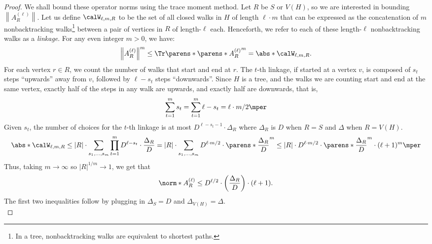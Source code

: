 \documentclass[11pt,letterpaper]{article}
\begin{document}
    \begin{proof}
        We shall bound these operator norms using the trace moment method. Let $R$ be $S$ or $V(H)$, so we are interested in bounding $\left\|A^{(\ell)}_R\right\|$. Let us define $\calW_{\ell,m,R}$ to be the set of all closed walks in $H$ of length $\ell\cdot m$ that can be expressed as the concatenation of $m$ nonbacktracking walks\footnote{In a tree, nonbacktracking walks are equivalent to shortest paths.} between a pair of vertices in $R$ of length-$\ell$ each.
        Henceforth, we refer to each of these length-$\ell$ nonbacktracking walks as a \emph{linkage}.
        For any even integer $m > 0$, we have:
        \[ \left\| A^{(\ell)}_R \right\|^m \le \Tr\parens*{ \parens*{A^{(\ell)}_R}^m } = \abs*{\calW_{\ell,m,R}}. \]
        For each vertex $r\in R$, we count the number of walks that start and end at $r$.
        The $t$-th linkage, if started at a vertex $v$, is composed of $s_t$ steps ``upwards'' away from $v$, followed by $\ell-s_t$ steps ``downwards''.
        Since $H$ is a tree, and the walks we are counting start and end at the same vertex, exactly half of the steps in any walk are upwards, and exactly half are downwards, that is,
        $$
            \sum_{t=1}^m s_t = \sum_{t=1}^m \ell-s_t = \ell\cdot m / 2\mper
        $$
        Given $s_t$, the number of choices for the $t$-th linkage is at most $D^{\ell-s_t-1} \cdot \Delta_R$ where $\Delta_R$ is $D$ when $R = S$ and $\Delta$ when $R = V(H)$.
        \[
            \abs*{\calW_{\ell,m,R}} \le |R| \cdot \sum_{s_1,\dots,s_{m}}  \prod_{t=1}^m D^{\ell-s_t}\cdot\frac{\Delta_R}{D} = |R| \cdot \sum_{s_1,\dots,s_m} D^{\ell\cdot m / 2} \cdot \parens*{\frac{\Delta_R}{D}}^m \le |R| \cdot D^{\ell\cdot m / 2} \cdot \parens*{\frac{\Delta_R}{D}}^m \cdot (\ell+1)^m \mper
        \]
        Thus, taking $m \to \infty$ so $|R|^{1/m} \to 1$, we get that
        \[ \norm*{ A^{(\ell)}_R } \le D^{\ell/2} \cdot \left( \frac{\Delta_R}{D} \right) \cdot (\ell+1). \]
        The first two inequalities follow by plugging in $\Delta_S = D$ and $\Delta_{V(H)} = \Delta$.\\


\end{proof}
\end{document}
